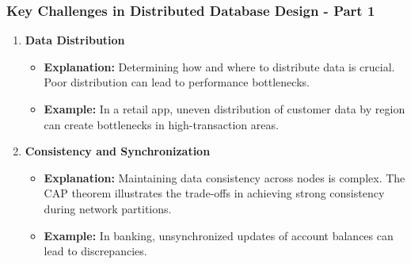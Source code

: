 \documentclass[aspectratio=169]{beamer}
\begin{document}
\begin{frame}[fragile]
    \frametitle{Key Challenges in Distributed Database Design - Part 1}
    \begin{enumerate}
        \item \textbf{Data Distribution}
            \begin{itemize}
                \item \textbf{Explanation:} Determining how and where to distribute data is crucial. Poor distribution can lead to performance bottlenecks.
                \item \textbf{Example:} In a retail app, uneven distribution of customer data by region can create bottlenecks in high-transaction areas.
            \end{itemize}
        
        \item \textbf{Consistency and Synchronization}
            \begin{itemize}
                \item \textbf{Explanation:} Maintaining data consistency across nodes is complex. The CAP theorem illustrates the trade-offs in achieving strong consistency during network partitions.
                \item \textbf{Example:} In banking, unsynchronized updates of account balances can lead to discrepancies.
            \end{itemize}
    \end{enumerate}
\end{frame}
\end{document}
